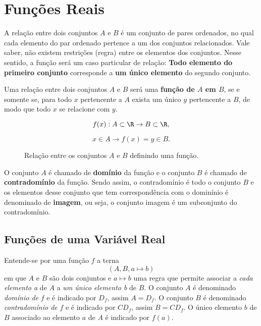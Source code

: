 \chapter{Funções Reais}
\label{chap:funções_reais}


	A relação entre dois conjuntos $A$ e $B$ é um conjunto de pares ordenados, no qual cada elemento do par ordenado pertence a um dos conjuntos relacionados. Vale saber, não existem restrições (regra) entre os elementos dos conjuntos. Nesse sentido, a função será um caso particular de relação: \textbf{Todo elemento do primeiro conjunto} corresponde a \textbf{um único elemento} do segundo conjunto.

	Uma relação entre dois conjuntos $A$ e $B$ será uma \textbf{função de $A$ em $B$}, se e somente se, para todo $x$ pertencente  a $A$ exista um único $y$ pertencente a $B$, de modo que todo $x$ se relacione com $y$.

	\[
			f(x): A \subset \R \rightarrow B \subset \R
	,\] 

	\[
		x \in A \rightarrow f(x) = y \in B
	.\]		

\begin{figure}[ht]
   \centering
   \caption{Relação entre os conjuntos $A$ e $B$ definindo uma função.}
   \label{fig:conjunto}
\end{figure}

	O conjunto $A$ é chamado de \textbf{domínio} da função e o conjunto $B$ é chamado de \textbf{contradomínio} da função. Sendo assim, o contradomínio é todo o conjunto $B$ e os elementos desse conjunto que tem correspondência com o dominínio é denominado de \textbf{imagem}, ou seja, o conjunto imagem é um subconjunto do contradomínio.

	 \section{Funções de uma Variável Real}
	 \label{sec:funções_de_uma_variável_real}
	 
	 Entende-se por uma função $f$ a terna
	 \begin{equation}
		 (A,B,a \mapsto b)
	 \end{equation}
	 em que $A$ e $B$ são dois conjuntos e $a \mapsto b$ uma regra que permite associar a \textit{cada elemento a} de $A$ a \textit{um único elemento b} de $B$. O conjunto $A$ é denominado \textit{domínio de} $f$ e é indicado por $D_f$, assim $A=D_f$. O conjunto $B$ é denominado \textit{contradomínio de} $f$ e é indicado por $CD_f$, assim $B=CD_f$. O único elemento $b$ de $B$ associado ao elemento $a$ de $A$ é indicado por $f(a)$.

